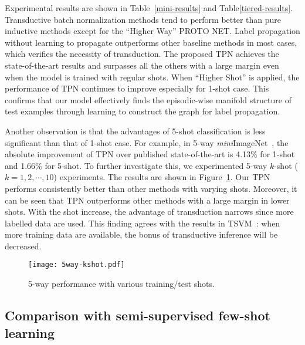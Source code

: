 \documentclass{article} \usepackage{iclr2019_conference,times}
\def\mini{{\textit{mini}ImageNet}}
\begin{document}
Experimental results are shown in Table~\ref{mini-results} and Table\ref{tiered-results}. Transductive batch normalization methods tend to perform better than pure inductive methods except for the ``Higher Way'' PROTO NET. Label propagation without learning to propagate outperforms other baseline methods in most cases, which verifies the necessity of transduction. The proposed TPN achieves the state-of-the-art results and surpasses all the others with a large margin even when the model is trained with regular shots. When ``Higher Shot'' is applied, the performance of TPN continues to improve especially for 1-shot case. 
This confirms that our model effectively finds the episodic-wise manifold structure of test examples through learning to construct the graph for label propagation.









Another observation is that the advantages of 5-shot classification is less significant than that of 1-shot case. For example, in 5-way \mini~, the absolute improvement of TPN over published state-of-the-art is 4.13\% for 1-shot and 1.66\% for 5-shot. 
To further investigate this, we experimented 5-way $k$-shot ($k=1,2,\cdots,10 $) experiments. The results are shown in Figure~\ref{5waykshot}. Our TPN performs consistently better than other methods with varying shots. Moreover, it can be seen that TPN outperforms other methods with a large margin in lower shots. With the shot increase, the advantage of transduction narrows since more labelled data are used. This finding agrees with the results in TSVM~\citep{tsvm}: when more training data are available, the bonus of transductive inference will be decreased.  



\begin{figure}[t]
  \centering
  \texttt{[image: 5way-kshot.pdf]}
  \caption{5-way performance with various training/test shots.}
  \label{5waykshot}
\end{figure}


\subsection{Comparison with semi-supervised few-shot learning}
\end{document}
